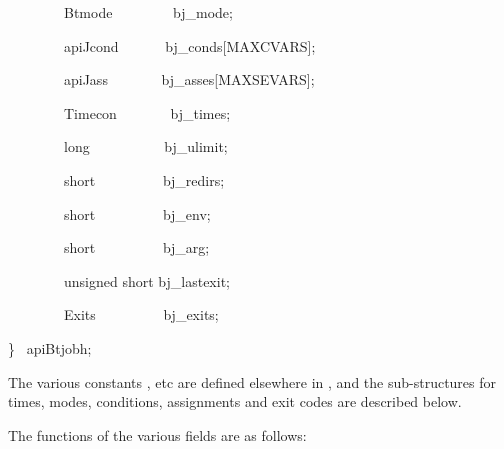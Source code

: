 \begin{expara}
\ \ \ \ \ \ \ \ Btmode \ \ \ \ \ \ \ \ bj\_mode;

\ \ \ \ \ \ \ \ apiJcond \ \ \ \ \ \ bj\_conds[MAXCVARS];

\ \ \ \ \ \ \ \ apiJass \ \ \ \ \ \ \ bj\_asses[MAXSEVARS];

\ \ \ \ \ \ \ \ Timecon \ \ \ \ \ \ \ bj\_times;

\ \ \ \ \ \ \ \ long \ \ \ \ \ \ \ \ \ \ bj\_ulimit;

\ \ \ \ \ \ \ \ short \ \ \ \ \ \ \ \ \ bj\_redirs;

\ \ \ \ \ \ \ \ short \ \ \ \ \ \ \ \ \ bj\_env;

\ \ \ \ \ \ \ \ short \ \ \ \ \ \ \ \ \ bj\_arg;

\ \ \ \ \ \ \ \ unsigned short bj\_lastexit;

\ \ \ \ \ \ \ \ Exits \ \ \ \ \ \ \ \ \ bj\_exits;

\} \ apiBtjobh;

\end{expara}

The various constants ,  etc are defined elsewhere in
, and the sub-structures for times, modes, conditions, assignments and exit codes are described below.

The functions of the various fields are as follows:

